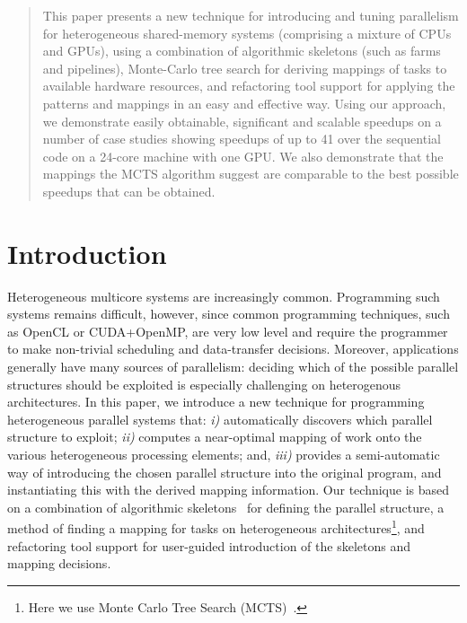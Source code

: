 \documentclass[smallextended]{svjour3}
\begin{document}
\begin{abstract}
This paper presents a new technique for 
introducing and tuning parallelism for heterogeneous shared-memory systems (comprising a
mixture of CPUs and GPUs), using a combination of algorithmic skeletons (such as farms and pipelines),
Monte-Carlo tree search for deriving mappings of tasks to available hardware resources, and refactoring
tool support for applying the patterns and mappings in an easy and effective way.
Using our approach, we demonstrate easily obtainable, significant and scalable speedups on a number of case studies showing speedups of up to 41 over the sequential code on a 24-core machine
with one GPU. We also demonstrate that 
the mappings the MCTS algorithm suggest are comparable to
the best possible speedups that can be obtained. %
\end{abstract}

\section{Introduction}
\noindent
Heterogeneous multicore systems are increasingly common.
Programming such systems remains difficult, however, since
common programming techniques, such as OpenCL or CUDA+OpenMP,
are very low level and 
require the programmer to make non-trivial scheduling and data-transfer decisions.
Moreover, applications generally have many sources of parallelism: deciding
which of the possible parallel structures should be exploited is especially challenging on heterogenous architectures.
%
In this paper, we introduce a new technique for programming heterogeneous parallel systems
that: \emph{i)} automatically discovers which parallel structure to exploit; \emph{ii)} computes a near-optimal mapping of work onto
the various heterogeneous processing elements; and, \emph{iii)} provides a semi-automatic way of
introducing the chosen parallel structure into the original program, and instantiating this with the derived mapping information.
Our technique is based on a combination of algorithmic skeletons~\cite{cole-th} for defining the parallel structure, %
 a method of finding a mapping for tasks on
heterogeneous architectures\footnote{Here we use Monte Carlo Tree Search (MCTS)~\cite{mc}.}, and refactoring tool support for user-guided introduction of the skeletons and mapping decisions. 
\end{document}
